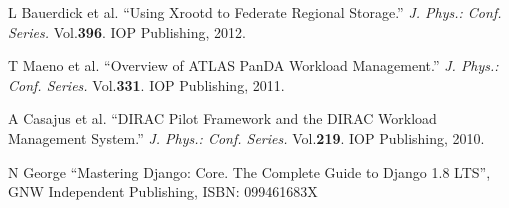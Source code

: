 \documentclass{PoS}
\begin{document}
\begin{thebibliography}{99}
L Bauerdick et al. ``Using Xrootd to Federate Regional Storage.'' \textit{J. Phys.: Conf. Series.} Vol.\textbf{396}. IOP Publishing, 2012.

T Maeno et al. ``Overview of ATLAS PanDA Workload Management.'' \textit{J. Phys.: Conf. Series.} Vol.\textbf{331}. IOP Publishing, 2011.


A Casajus et al. ``DIRAC Pilot Framework and the DIRAC
Workload Management System.'' \textit{J. Phys.: Conf. Series.} Vol.\textbf{219}. IOP Publishing, 2010.

N George ``Mastering Django: Core. The Complete Guide to Django 1.8 LTS'', GNW Independent Publishing, ISBN: 099461683X



\end{thebibliography}
\end{document}
